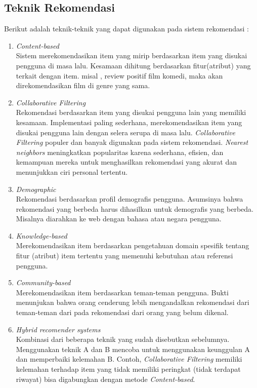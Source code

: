 \subsection{Teknik Rekomendasi}
\label{sec:teknik rekomendasi}
Berikut adalah teknik-teknik yang dapat digunakan pada sistem rekomendasi : \\%
\begin{enumerate}
	\item \textit{Content-based}\\
		Sistem merekomendasikan item yang mirip berdasarkan item yang disukai pengguna di masa lalu. Kesamaan dihitung berdasarkan fitur(atribut) yang terkait dengan item. misal , review positif film komedi, maka akan direkomendasikan film di genre yang sama. 

	\item \textit{Collaborative Filtering} \\
		 Rekomendasi berdasarkan item yang disukai pengguna lain yang memiliki kesamaan. Implementasi paling sederhana, merekomendasikan item yang disukai pengguna lain dengan selera serupa di masa lalu.  \textit{Collaborative Filtering} populer dan banyak digunakan pada sistem rekomendasi. \textit{Nearest neighbors} meningkatkan popularitas karena sederhana, efisien, dan kemampuan mereka untuk menghasilkan rekomendasi yang akurat dan menunjukkan ciri personal tertentu.
	
	\item \textit{Demographic} \\
		Rekomendasi berdasarkan profil demografis pengguna. Asumsinya bahwa rekomendasi yang berbeda harus dihasilkan untuk demografis yang berbeda. Misalnya diarahkan ke web dengan bahasa atau negara pengguna. 

	\item \textit{Knowledge-based} \\
		Merekomendasikan item berdasarkan pengetahuan domain spesifik tentang fitur (atribut) item tertentu yang memenuhi kebutuhan atau referensi pengguna. 

	\item \textit{Community-based} \\
		Merekomendasikan item berdasarkan teman-teman pengguna. Bukti menunjukan bahwa orang cenderung lebih mengandalkan rekomendasi dari teman-teman dari pada rekomendasi dari orang yang belum dikenal. 

	\item \textit{Hybrid recomender systems} \\
		Kombinasi dari beberapa teknik yang sudah disebutkan sebelumnya. Menggunakan teknik A dan B mencoba untuk menggunakan keunggulan A dan memperbaiki kelemahan B. Contoh, \textit{Collaborative Filtering} memiliki kelemahan terhadap item yang tidak memiliki peringkat (tidak terdapat riwayat) bisa digabungkan dengan metode \textit{Content-based}.
		
\end{enumerate}

